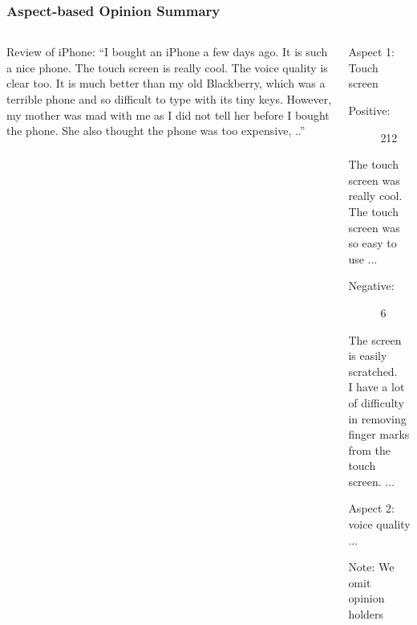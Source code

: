 \documentclass[t]{beamer}
\begin{document}
\begin{frame} \frametitle{Aspect-based Opinion Summary} %


 \begin{columns}[T]

\begin{column}{0.38\textwidth}

\begin{block}{Review of iPhone:}
\small{
``I bought an iPhone a few days
ago. It is such a nice phone. The touch screen is really cool. The voice quality is clear too. It is much better than my old Blackberry, which was a terrible phone and so difficult to type with its tiny keys. However, my mother was mad with me as I did not tell her before I bought the phone. She also thought the phone was too expensive, ..''}
\end{block}


\end{column}

\begin{column}{0.58\textwidth}

\begin{block}{Aspect 1: Touch screen}

\begin{description}
\item [Positive:] 212
\end{description}

\small{The touch screen was really cool.  \\
The touch screen was so easy to use ... \\}

\begin{description}
\item [Negative:] 6 
\end{description}

\small{The screen is easily scratched. \\
I have a lot of difficulty in removing finger marks from the  touch
screen. ... }

\end{block}

\begin{block}{Aspect 2: voice quality}
... 
\end{block}

Note: We omit opinion holders

    \end{column}
\end{columns}


\end{frame} 
\end{document}
